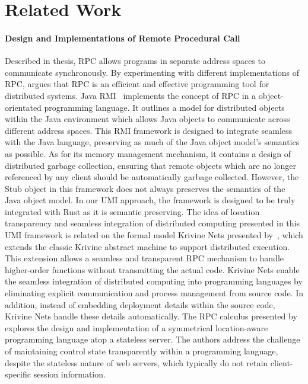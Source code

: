 \section{Related Work}
\label{chap3:related-work}
\paragraph*{Design and Implementations of Remote Procedural Call}
Described in  thesis, RPC allows programs in separate address spaces to communicate synchronously. By experimenting with different implementations of RPC, \citet{10.5555/910306} argues that RPC is an efficient and effective programming tool for distributed systems. Java RMI~\citep{10.5555/1268049.1268066} implements the concept of RPC in a object-orientated programming language. It outlines a model for distributed objects within the Java environment which allows Java objects to communicate across different address spaces. This RMI framework is designed to integrate seamless with the Java language, preserving as much of the Java object model's semantics as possible. As for its memory management mechanism, it contains a design of distributed garbage collection, ensuring that remote objects which are no longer referenced by any client should be automatically garbage collected. However, the Stub object in this framework does not always preserves the semantics of the Java object model. In our UMI approach, the framework is designed to be truly integrated with Rust as it is semantic preserving. The idea of location transparency and seamless integration of distributed computing presented in this UMI framework is related on the formal model Krivine Nets presented by~\citet{10.1145/2628136.2628152}, which extends the classic Krivine abstract machine to support distributed execution. This extension allows a seamless and transparent RPC mechanism to handle higher-order functions without transmitting the actual code. Krivine Nets enable the seamless integration of distributed computing into programming languages by eliminating explicit communication and process management from source code. In addition, instead of embedding deployment details within the source code, Krivine Nets handle these details automatically. The RPC calculus presented by \citet{cooper2009rpc} explores the design and implementation of a symmetrical location-aware programming language atop a stateless server. The authors address the challenge of maintaining control state transparently within a programming language, despite the stateless nature of web servers, which typically do not retain client-specific session information.
